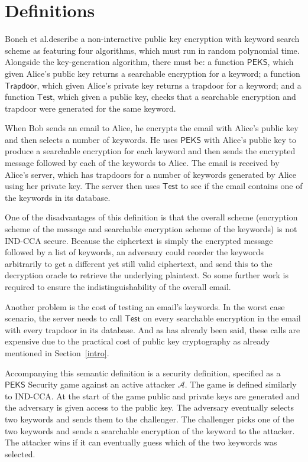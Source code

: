 \documentclass[a4paper,11pt]{article}
\begin{document}
    \section{Definitions}
    \label{definitions}

    Boneh et al.\@ describe a non-interactive public key encryption with keyword search scheme as featuring four algorithms, which must run in random polynomial time. Alongside the key-generation algorithm, there must be: a function $\mathsf{PEKS}$, which given Alice's public key returns a searchable encryption for a keyword; a function $\mathsf{Trapdoor}$, which given Alice's private key returns a trapdoor for a keyword; and a function $\mathsf{Test}$, which given a public key, checks that a searchable encryption and trapdoor were generated for the same keyword.

    When Bob sends an email to Alice, he encrypts the email with Alice's public key and then selects a number of keywords. He uses $\mathsf{PEKS}$ with Alice's public key to produce a searchable encryption for each keyword and then sends the encrypted message followed by each of the keywords to Alice. The email is received by Alice's server, which has trapdoors for a number of keywords generated by Alice using her private key. The server then uses $\mathsf{Test}$ to see if the email contains one of the keywords in its database.

    One of the disadvantages of this definition is that the overall scheme (encryption scheme of the message and searchable encryption scheme of the keywords) is not IND-CCA secure. Because the ciphertext is simply the encrypted message followed by a list of keywords, an adversary could reorder the keywords arbitrarily to get a different yet still valid ciphertext, and send this to the decryption oracle to retrieve the underlying plaintext. So some further work is required to ensure the indistinguishability of the overall email.

    Another problem is the cost of testing an email's keywords. In the worst case scenario, the server needs to call $\mathsf{Test}$ on every searchable encryption in the email with every trapdoor in its database. And as has already been said, these calls are expensive due to the practical cost of public key cryptography as already mentioned in Section~\ref{intro}.

    Accompanying this semantic definition is a security definition, specified as a $\mathsf{PEKS}$ Security game against an active attacker $\mathcal{A}$. The game is defined similarly to IND-CCA. At the start of the game public and private keys are generated and the adversary is given access to the public key. The adversary eventually selects two keywords and sends them to the challenger. The challenger picks one of the two keywords and sends a searchable encryption of the keyword to the attacker. The attacker wins if it can eventually guess which of the two keywords was selected.
\end{document}

